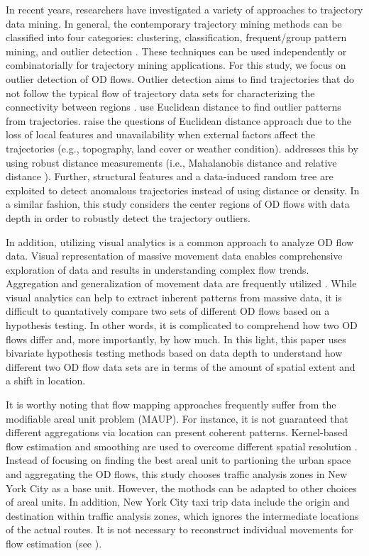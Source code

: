 \documentclass[a4paper,UKenglish]{lipics-v2016}
\begin{document}
In recent years, researchers have investigated a variety of approaches to trajectory data mining.
In general, the contemporary trajectory mining methods can be classified into four categories: clustering, classification, frequent/group pattern mining, and outlier detection \cite{mazimpaka16JOSIS,zheng15ACMTIST}. These techniques can be used independently or combinatorially for trajectory mining applications. For this study, we focus on outlier detection of OD flows. Outlier detection aims to find trajectories that do not follow the typical flow of trajectory data sets for characterizing the connectivity between regions \cite{mazimpaka16JOSIS}. \cite{fontes13GeoInfo,lee08ICDE} use Euclidean distance to find outlier patterns from trajectories. \cite{pan13ACMGIS,liu12IJGIS} raise the questions of Euclidean distance approach due to the loss of local features and unavailability when external factors affect the trajectories (e.g., topography, land cover or weather condition).  \cite{pan13ACMGIS,liu12IJGIS} addresses this by using robust distance measurements (i.e., Mahalanobis distance \cite{pan13ACMGIS} and relative distance \cite{liu12IJGIS}). Further, structural features \cite{yuan11JCIS} and a data-induced random tree  \cite{zhang11UC} are exploited to detect anomalous trajectories instead of using distance or density. In a similar fashion, this study considers the center regions of OD flows with data depth in order to robustly detect the trajectory outliers. 

In addition, utilizing visual analytics is a common approach to analyze OD flow data.
Visual representation of massive movement data enables comprehensive exploration of data and results in understanding complex flow trends.
Aggregation and generalization of movement data are frequently utilized \cite{andrienko08VAST,adrienko11IEEETVCG,guo14IEEETVCG}.
While visual analytics can help to extract inherent patterns from massive data, it is difficult to quantatively compare two sets of different OD flows based on a hypothesis testing.
In other words, it is complicated to comprehend how two OD flows differ and, more importantly, by how much.
In this light, this paper uses bivariate hypothesis testing methods based on data depth to understand how different two OD flow data sets are in terms of the amount of spatial extent and a shift in location. 

It is worthy noting that flow mapping approaches frequently suffer from the modifiable areal unit problem (MAUP). For instance, it is not guaranteed that different aggregations via location can present coherent patterns.
Kernel-based flow estimation and smoothing are used to overcome different spatial resolution \cite{guo14IEEETVCG}. 
Instead of focusing on finding the best areal unit to partioning the urban space and aggregating the OD flows, this study chooses traffic analysis zones in New York City as a base unit. However, the mothods can be adapted to other choices of areal units.
In addition, New York City taxi trip data include the origin and destination within traffic analysis zones, which ignores the intermediate locations of the actual routes.
It is not necessary to reconstruct individual movements for flow estimation (see \cite{duckham16ICGIS}).
\end{document}
